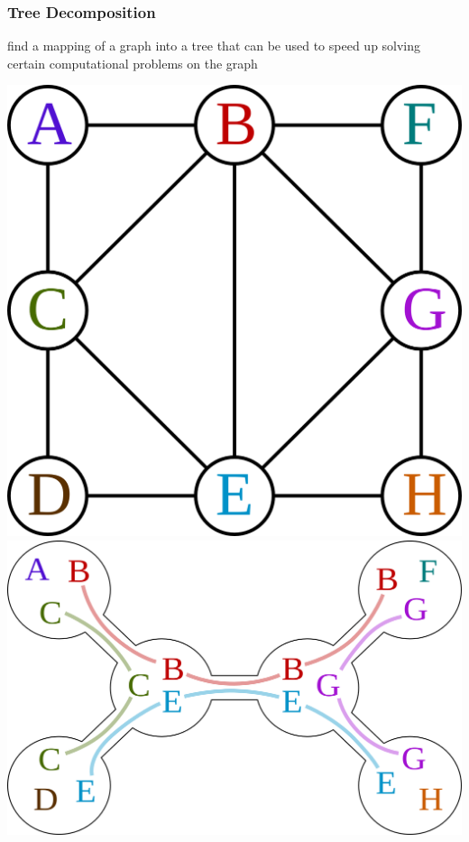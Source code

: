 \documentclass[titlepage,german,presentation]{beamer}
\begin{document}
\begin{frame}
\frametitle{Tree Decomposition}
\begin{block}{}
  find a mapping of a graph into a tree that can be used to speed up solving certain computational problems on the graph
\end{block}
\begin{center}
\includegraphics[height=0.37\textheight]{my_tree_3.png}\qquad
\includegraphics[height=0.37\textheight]{my_tree_4.png}
\end{center}


\end{frame}
\end{document}
